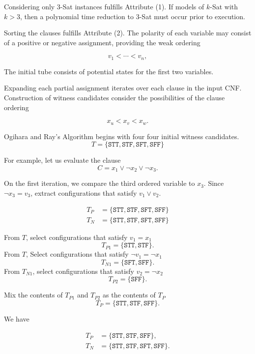 Considering only $3$-{\sc Sat} instances fulfills Attribute (1).  If models of $k$-{\sc Sat} with $k > 3$, then a polynomial time reduction to $3$-{\sc Sat} must occur prior to execution.

Sorting the clauses fulfills Attribute (2).  The polarity of each variable may consist of a positive or negative assignment, providing the weak ordering

\[
v_1 < \cdots < v_n,
\]

The initial tube consists of potential states for the first two variables.


Expanding each partial assignment iterates over each clause in the input CNF.  Construction of witness candidates consider the possibilities of the clause ordering

\[
x_u < x_v < x_w.
\]



\FloatBarrier

{\sc Ogihara and Ray's Algorithm} begins with four four initial witness candidates. 
\[
T = \{ \texttt{STT}, \texttt{STF}, \texttt{SFT}, \texttt{SFF}\}
\]

For example, let us evaluate the clause
\[
C = x_1 \vee \neg x_2 \vee \neg x_3.
\]

On the first iteration, we compare the third ordered variable to $x_3$.  Since $\neg x_3 = v_3$, extract configurations that satisfy $v_1 \vee v_2$.  

\begin{align*}
T_P &= \{ \texttt{STT}, \texttt{STF}, \texttt{SFT}, \texttt{SFF}\} \\
T_N &= \{ \texttt{STT}, \texttt{STF}, \texttt{SFT}, \texttt{SFF}\} 
\end{align*}

\noindent From $T$, select configurations that satisfy $v_1 = x_1$
\[
T_{P1} = \{ \texttt{STT}, \texttt{STF} \}.
\]
\noindent From $T$, Select configurations that satisfy $\neg v_1 = \neg x_1$
\[
T_{N1} = \{ \texttt{SFT}, \texttt{SFF} \}.
\]
\noindent From $T_{N1}$, select configurations that satisfy $v_2 = \neg x_2$
\[
T_{P2} = \{ \texttt{SFF} \}.
\]

\noindent Mix the contents of $T_{P1}$ and $T_{P2}$ as the contents of $T_P$
\[
T_P = \{ \texttt{STT}, \texttt{STF}, \texttt{SFF} \}.
\]

\noindent We have 

\begin{align*}
T_P &= \{ \texttt{STT}, \texttt{STF}, \texttt{SFF} \}, \\
T_N &= \{ \texttt{STT}, \texttt{STF}, \texttt{SFT}, \texttt{SFF}\}.
\end{align*}


